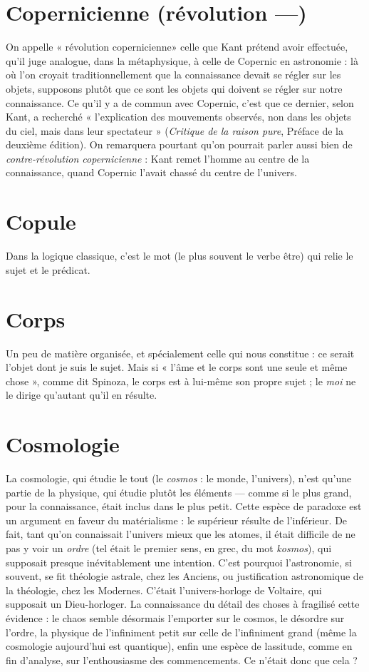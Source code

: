 \section{Copernicienne (révolution —)}
On appelle « révolution copernicienne» celle que Kant prétend
avoir effectuée, qu’il juge analogue, dans la métaphysique, à celle de Copernic
en astronomie : là où l’on croyait traditionnellement que la connaissance devait
se régler sur les objets, supposons plutôt que ce sont les objets qui doivent se
régler sur notre connaissance. Ce qu’il y a de commun avec Copernic, c’est que
ce dernier, selon Kant, a recherché « l'explication des mouvements observés,
non dans les objets du ciel, mais dans leur spectateur » ({\it Critique de la raison
pure}, Préface de la deuxième édition). On remarquera pourtant qu’on pourrait
parler aussi bien de {\it contre-révolution copernicienne} : Kant remet l’homme au
centre de la connaissance, quand Copernic l’avait chassé du centre de l’univers.

\section{Copule}
Dans la logique classique, c’est le mot (le plus souvent le verbe
être) qui relie le sujet et le prédicat.

\section{Corps}
Un peu de matière organisée, et spécialement celle qui nous
constitue : ce serait l’objet dont je suis le sujet. Mais si « l’âme et le
corps sont une seule et même chose », comme dit Spinoza, le corps est à lui-même
son propre sujet ; le {\it moi} ne le dirige qu’autant qu’il en résulte.

\section{Cosmologie}
La cosmologie, qui étudie le tout (le {\it cosmos} : le monde,
l'univers), n’est qu’une partie de la physique, qui étudie
plutôt les éléments — comme si le plus grand, pour la connaissance, était inclus
dans le plus petit. Cette espèce de paradoxe est un argument en faveur du
matérialisme : le supérieur résulte de l’inférieur. De fait, tant qu’on connaissait
l'univers mieux que les atomes, il était difficile de ne pas y voir un {\it ordre} (tel
était le premier sens, en grec, du mot {\it kosmos}), qui supposait presque inévitablement
une intention. C’est pourquoi l’astronomie, si souvent, se fit théologie
astrale, chez les Anciens, ou justification astronomique de la théologie, chez les
Modernes. C’était l’univers-horloge de Voltaire, qui supposait un Dieu-horloger.
La connaissance du détail des choses à fragilisé cette évidence : le chaos
semble désormais l’emporter sur le cosmos, le désordre sur l’ordre, la physique
de l’infiniment petit sur celle de l’infiniment grand (même la cosmologie
aujourd’hui est quantique), enfin une espèce de lassitude, comme en fin d’analyse,
sur l’enthousiasme des commencements. Ce n’était donc que cela ?

